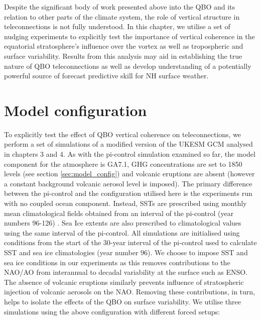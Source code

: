 Despite the significant body of work presented above into the QBO and its relation to other parts of the climate system, the role of vertical structure in teleconnections is not fully understood. In this chapter, we utilise a set of nudging experiments to explicitly test the importance of vertical coherence in the equatorial stratosphere's influence over the vortex as well as tropospheric and surface variability. Results from this analysis may aid in establishing the true nature of QBO teleconnections as well as develop understanding of a potentially powerful source of forecast predictive skill for NH surface weather.

\section{Model configuration}

To explicitly test the effect of QBO vertical coherence on teleconnections, we perform a set of simulations of a modified version of the UKESM GCM analysed in chapters 3 and 4. As with the pi-control simulation examined so far, the model component for the atmosphere is GA7.1, GHG concentrations are set to 1850 levels (see section \ref{sec:model_config}) and volcanic eruptions are absent (however a constant background volcanic aerosol level is imposed). The primary difference between the pi-control and the configuration utilised here is the experiments run with no coupled ocean component. Instead, SSTs are prescribed using monthly mean climatological fields obtained from an interval of the pi-control (year numbers 96-126) \citep{oconnorAssessment2021b}. Sea Ice extents are also prescribed to climatological values using the same interval of the pi-control. All simulations are initialised using conditions from the start of the 30-year interval of the pi-control used to calculate SST and sea ice climatologies (year number 96). We choose to impose SST and sea ice conditions in our experiments as this removes contributions to the NAO/AO from interannual to decadal variability at the surface such as ENSO. The absence of volcanic eruptions similarly prevents influence of stratospheric injection of volcanic aerosols on the NAO. Removing these contributions, in turn, helps to isolate the effects of the QBO on surface variability. We utilise three simulations using the above configuration with different forced setups:

